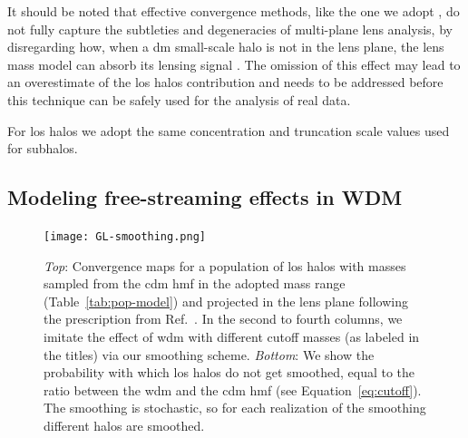 It should be noted that effective convergence methods, like the one we adopt \cite{CaganSengul:2020nat}, do not fully capture the subtleties and degeneracies of multi-plane lens analysis, by disregarding how, when a \gls*{dm} small-scale halo is not in the lens plane, the lens mass model can absorb its lensing signal \cite{Fleury:2021tke, Amorisco:2021iim, He:2021rjd}. The omission of this effect may lead to an overestimate of the \gls*{los} halos contribution and needs to be addressed before this technique can be safely used for the analysis of real data.

For \gls*{los} halos we adopt the same concentration and truncation scale values used for subhalos.


\subsection{Modeling free-streaming effects in WDM}
\label{subsec:free-streaming}

\begin{figure}
    \centering
    \texttt{[image: GL-smoothing.png]}
    \caption{
    \textit{Top}: Convergence maps for a population of \gls*{los} halos with masses sampled from the \gls*{cdm} \gls*{hmf} in the adopted mass range (Table~\ref{tab:pop-model}) and projected in the lens plane following the prescription from Ref.~\cite{CaganSengul:2020nat}.
    In the second to fourth columns, we imitate the effect of \gls*{wdm} with different cutoff masses (as labeled in the titles) via our smoothing scheme. \textit{Bottom}: We show the probability with which \gls*{los} halos do not get smoothed, equal to the ratio between the \gls*{wdm} and the \gls*{cdm} \gls*{hmf} (see Equation~\eqref{eq:cutoff}). The smoothing is stochastic, so for each realization of the smoothing different halos are smoothed.
    }
    \label{fig:smoothing}
\end{figure}

